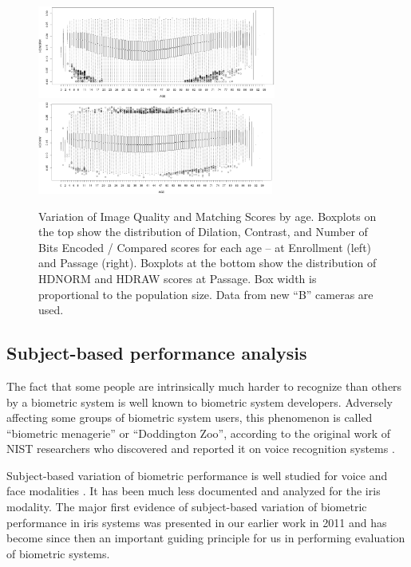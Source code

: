 \documentclass{cta-author}%
\begin{document}
\begin{figure}[!t]
\includegraphics[width=0.5\linewidth,height=1.2in]{eps/HDNORM.eps}\quad
\includegraphics[width=0.5\linewidth,height=1.2in]{eps/HDRAW.eps} 
\caption{Variation of Image Quality and Matching Scores by age.  
Boxplots on the top show  the distribution of Dilation, Contrast, and Number of Bits Encoded / Compared scores for each age --
at Enrollment (left) and  Passage (right). Boxplots at the bottom show  the distribution of HDNORM and  HDRAW scores at Passage.
Box width is proportional to the population size. 
Data from new ``B'' cameras are used. 
\label{fHDpassage}}
\end{figure}




\subsection{Subject-based performance analysis }
\label{s.s-b}

The fact that some people are intrinsically much harder to recognize than others by a biometric system is well known to biometric system developers. Adversely affecting some groups of biometric system users, this phenomenon is called ``biometric menagerie'' or ``Doddington Zoo'', according to the original work of NIST researchers who discovered and reported it on voice recognition systems \cite{Doddington}. 


Subject-based variation of biometric performance
is well studied for voice and face modalities \cite{Poh}. It has been much less documented and analyzed for the iris modality.  
The major first evidence of subject-based variation of biometric performance in iris systems 
was presented in our earlier work in 2011 \cite{Gorodnichy2011} and has become since then an important guiding principle for us in performing evaluation of biometric systems.
\end{document}
